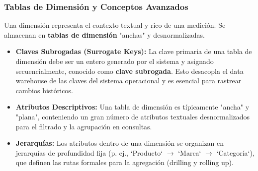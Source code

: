 \documentclass{article}
\begin{document}
\subsubsection{Tablas de Dimensión y Conceptos Avanzados}
Una dimensión representa el contexto textual y rico de una medición. Se almacenan en \textbf{tablas de dimensión} "anchas" y desnormalizadas.
\begin{itemize}
    \item \textbf{Claves Subrogadas (Surrogate Keys):} La clave primaria de una tabla de dimensión debe ser un entero generado por el sistema y asignado secuencialmente, conocido como \textbf{clave subrogada}. Esto desacopla el data warehouse de las claves del sistema operacional y es esencial para rastrear cambios históricos.
    \item \textbf{Atributos Descriptivos:} Una tabla de dimensión es típicamente "ancha" y "plana", conteniendo un gran número de atributos textuales desnormalizados para el filtrado y la agrupación en consultas.
    \item \textbf{Jerarquías:} Los atributos dentro de una dimensión se organizan en jerarquías de profundidad fija (p. ej., `Producto` $\to$ `Marca` $\to$ `Categoría`), que definen las rutas formales para la agregación (drilling y rolling up).
\end{itemize}
\end{document}
